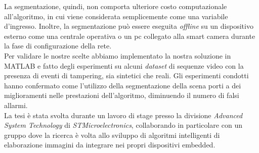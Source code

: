 La segmentazione, quindi, non comporta ulteriore costo computazionale all'algoritmo, in cui viene considerata semplicemente come una variabile d'ingresso.
Inoltre, la segmentazione pu\`o essere eseguita \textit{offline} su un dispositivo esterno come una centrale operativa o un pc collegato alla smart camera durante la fase di configurazione della rete.\\
Per validare le nostre scelte abbiamo implementato la nostra soluzione in MATLAB %
e fatto degli esperimenti su alcuni \textit{dataset} di sequenze video con la presenza di eventi di tampering, sia sintetici che reali.
Gli esperimenti condotti hanno confermato come l'utilizzo della segmentazione della scena porti a dei miglioramenti nelle prestazioni dell'algoritmo, diminuendo il numero di falsi allarmi.\\
La tesi \`e stata svolta durante un lavoro di stage presso la divisione \textit{Advanced System Technology} di \textit{STMicroelectronics}, collaborando in particolare con un gruppo dove la ricerca \`e volta allo sviluppo di algoritmi intelligenti di elaborazione immagini da integrare nei propri dispositivi embedded.\\
